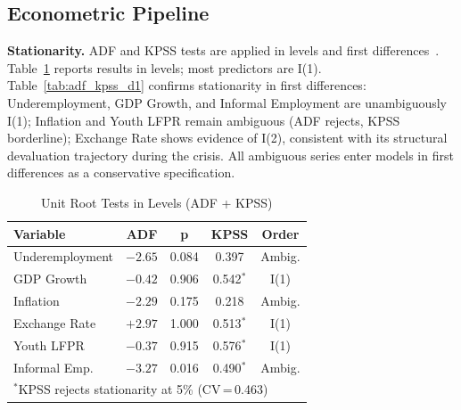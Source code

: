 \documentclass[sigconf]{acmart}
\begin{document}
\subsection{Econometric Pipeline}

\textbf{Stationarity.} ADF and KPSS tests are applied in levels and first differences~\cite{kpss1992}. Table~\ref{tab:adf_kpss} reports results in levels; most predictors are I(1). Table~\ref{tab:adf_kpss_d1} confirms stationarity in first differences: Underemployment, GDP Growth, and Informal Employment are unambiguously I(1); Inflation and Youth LFPR remain ambiguous (ADF rejects, KPSS borderline); Exchange Rate shows evidence of I(2), consistent with its structural devaluation trajectory during the crisis. All ambiguous series enter models in first differences as a conservative specification.

\begin{table}[h]
\caption{Unit Root Tests in Levels (ADF + KPSS)}
\label{tab:adf_kpss}
\setlength{\tabcolsep}{3pt}
\footnotesize
\begin{tabular}{lcccc}
\toprule
\textbf{Variable} & \textbf{ADF} & \textbf{p} & \textbf{KPSS} & \textbf{Order}\\
\midrule
Underemployment  & $-2.65$ & 0.084 & 0.397 & Ambig.\\
GDP Growth       & $-0.42$ & 0.906 & 0.542$^*$ & I(1)\\
Inflation        & $-2.29$ & 0.175 & 0.218 & Ambig.\\
Exchange Rate    & $+2.97$ & 1.000 & 0.513$^*$ & I(1)\\
Youth LFPR       & $-0.37$ & 0.915 & 0.576$^*$ & I(1)\\
Informal Emp.    & $-3.27$ & 0.016 & 0.490$^*$ & Ambig.\\
\midrule
\multicolumn{5}{l}{\scriptsize $^*$KPSS rejects stationarity at 5\% (CV\,=\,0.463)}\\
\bottomrule
\end{tabular}
\end{table}
\end{document}
